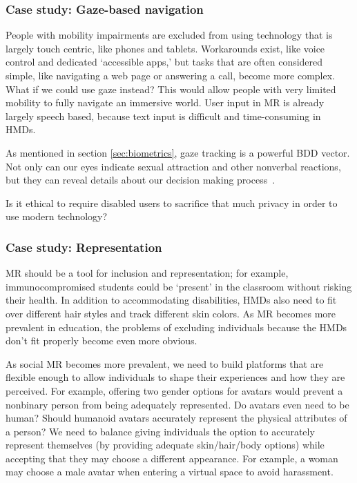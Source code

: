 \subsubsection{Case study: Gaze-based navigation}

People with mobility impairments are excluded from using technology that is largely touch centric, like phones and tablets. Workarounds exist, like voice control and dedicated `accessible apps,' but tasks that are often considered simple, like navigating a web page or answering a call, become more complex. What if we could use gaze instead? This would allow people with very limited mobility to fully navigate an immersive world. User input in MR is already largely speech based, because text input is difficult and time-consuming in HMDs.

As mentioned in section \ref{sec:biometrics}, gaze tracking is a powerful BDD vector. Not only can our eyes indicate sexual attraction and other nonverbal reactions, but they can reveal details about our decision making process~\cite{costandi}.

Is it ethical to require disabled users to sacrifice that much privacy in order to use modern technology?


\subsubsection{Case study: Representation}

MR should be a tool for inclusion and representation; for example, immunocompromised students could be `present' in the classroom without risking their health.  In addition to accommodating disabilities, HMDs also need to fit over different hair styles and track different skin colors. As MR becomes more prevalent in education, the problems of excluding individuals because the HMDs don't fit properly become even more obvious.

As social MR becomes more prevalent, we need to build platforms that are flexible enough to allow individuals to shape their experiences and how they are perceived. For example, offering two gender options for avatars would prevent a nonbinary person from being adequately represented. Do avatars even need to be human? Should humanoid avatars accurately represent the physical attributes of a person? We need to balance giving individuals the option to accurately represent themselves (by providing adequate skin/hair/body options) while accepting that they may choose a different appearance. For example, a woman may choose a male avatar when entering a virtual space to avoid harassment.

